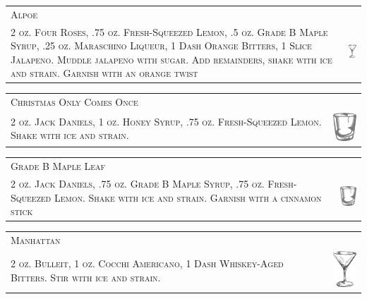 \documentclass{article}
\begin{document}
\begin{tabular}{b{2.5in} m{0.625in}}
  \multicolumn{2}{p{3.5in}}{\centering\Huge\textsc{Alpoe}} \\ 
  
  \textsc{2 oz. Four Roses, .75 oz. Fresh-Squeezed Lemon, .5 oz. Grade
    B Maple Syrup, .25 oz.  Maraschino Liqueur, 1 Dash Orange Bitters,
    1 Slice Jalapeno. Muddle jalapeno with sugar. Add remainders,
    shake with ice and strain. Garnish with an orange twist} &
  \includegraphics[width=0.5in]{goblet.png}
\end{tabular}

\begin{tabular}{b{2.5in} m{0.625in}}
  \multicolumn{2}{p{3.5in}}{\centering\Huge\textsc{Christmas Only Comes Once}} \\ 
  
  \textsc{2 oz. Jack Daniels, 1 oz. Honey Syrup, .75 oz.
    Fresh-Squeezed Lemon. Shake with ice and strain.} &
  \includegraphics[width=0.5in]{rocks_glass.png}
\end{tabular}

\begin{tabular}{b{2.5in} m{0.625in}}
  \multicolumn{2}{p{3.5in}}{\centering\Huge\textsc{Grade B Maple Leaf}} \\ 
  
  \textsc{2 oz. Jack Daniels, .75 oz. Grade B Maple Syrup, .75
    oz. Fresh-Squeezed Lemon. Shake with ice and strain.  Garnish with
    a cinnamon stick} & \includegraphics[width=0.5in]{rocks_glass.png}
\end{tabular}

\begin{tabular}{b{2.5in} m{0.625in}}
  \multicolumn{2}{p{3.5in}}{\centering\Huge\textsc{Manhattan}} \\ 
  
  \textsc{2 oz. Bulleit, 1 oz. Cocchi Americano, 1 Dash Whiskey-Aged
    Bitters. Stir with ice and strain.} &
  \includegraphics[width=0.5in]{goblet.png}
\end{tabular}
\end{document}
